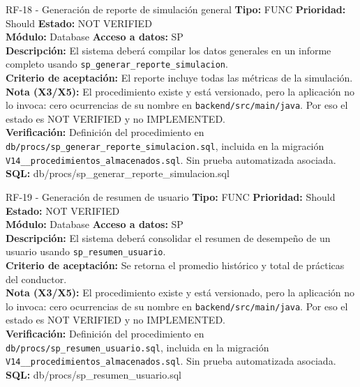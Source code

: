 \documentclass[11pt,a4paper]{article}
\begin{document}
\begin{requisito}{RF-18 - Generación de reporte de simulación general}
    \textbf{Tipo:} FUNC \quad \textbf{Prioridad:} Should \quad \textbf{Estado:} NOT VERIFIED \\[0.2cm]
    \textbf{Módulo:} Database \quad \textbf{Acceso a datos:} SP \\[0.2cm]
    \textbf{Descripción:} El sistema deberá compilar los datos generales en un informe completo usando \texttt{sp\_generar\_reporte\_simulacion}. \\[0.2cm]
    \textbf{Criterio de aceptación:} El reporte incluye todas las métricas de la simulación. \\[0.2cm]
    \textbf{Nota (X3/X5):} El procedimiento existe y está versionado, pero la aplicación no lo invoca: cero ocurrencias de su nombre en \texttt{backend/src/main/java}. Por eso el estado es NOT VERIFIED y no IMPLEMENTED. \\[0.2cm]
    \textbf{Verificación:} Definición del procedimiento en \texttt{db/procs/sp\_generar\_reporte\_simulacion.sql}, incluida en la migración \texttt{V14\_\_procedimientos\_almacenados.sql}. Sin prueba automatizada asociada. \quad \textbf{SQL:} db/procs/sp\_generar\_reporte\_simulacion.sql
\end{requisito}

\begin{requisito}{RF-19 - Generación de resumen de usuario}
    \textbf{Tipo:} FUNC \quad \textbf{Prioridad:} Should \quad \textbf{Estado:} NOT VERIFIED \\[0.2cm]
    \textbf{Módulo:} Database \quad \textbf{Acceso a datos:} SP \\[0.2cm]
    \textbf{Descripción:} El sistema deberá consolidar el resumen de desempeño de un usuario usando \texttt{sp\_resumen\_usuario}. \\[0.2cm]
    \textbf{Criterio de aceptación:} Se retorna el promedio histórico y total de prácticas del conductor. \\[0.2cm]
    \textbf{Nota (X3/X5):} El procedimiento existe y está versionado, pero la aplicación no lo invoca: cero ocurrencias de su nombre en \texttt{backend/src/main/java}. Por eso el estado es NOT VERIFIED y no IMPLEMENTED. \\[0.2cm]
    \textbf{Verificación:} Definición del procedimiento en \texttt{db/procs/sp\_resumen\_usuario.sql}, incluida en la migración \texttt{V14\_\_procedimientos\_almacenados.sql}. Sin prueba automatizada asociada. \quad \textbf{SQL:} db/procs/sp\_resumen\_usuario.sql
\end{requisito}
\end{document}
